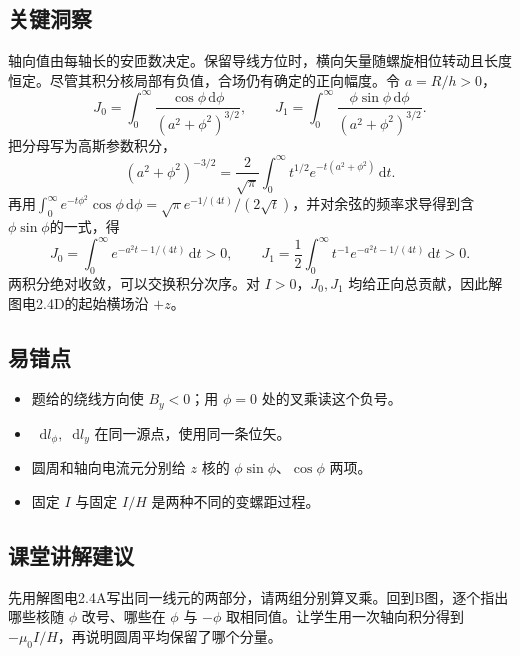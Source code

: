 \documentclass[UTF8,fontset=fandol,a4paper,11pt]{ctexart}
\newcommand{\dd}{\mathop{}\!\mathrm{d}}
\begin{document}


\subsection*{关键洞察}

轴向值由每轴长的安匝数决定。保留导线方位时，横向矢量随螺旋相位转动且长度恒定。尽管其积分核局部有负值，合场仍有确定的正向幅度。令 $a=R/h>0$，
\[
J_0=\int_0^\infty\frac{\cos\phi\,\mathrm d\phi}{(a^2+\phi^2)^{3/2}},\qquad
J_1=\int_0^\infty\frac{\phi\sin\phi\,\mathrm d\phi}{(a^2+\phi^2)^{3/2}}.
\]
把分母写为高斯参数积分，
\[
(a^2+\phi^2)^{-3/2}
=\frac2{\sqrt\pi}\int_0^\infty t^{1/2}e^{-t(a^2+\phi^2)}\,\mathrm dt.
\]
再用$\int_0^\infty e^{-t\phi^2}\cos\phi\,\mathrm d\phi
=\sqrt\pi e^{-1/(4t)}/(2\sqrt t)$，并对余弦的频率求导得到含$\phi\sin\phi$的一式，得
\[
J_0=\int_0^\infty e^{-a^2t-1/(4t)}\,\mathrm dt>0,\qquad
J_1=\frac12\int_0^\infty t^{-1}e^{-a^2t-1/(4t)}\,\mathrm dt>0.
\]
两积分绝对收敛，可以交换积分次序。对 $I>0$，$J_0,J_1$ 均给正向总贡献，因此解图电2.4D的起始横场沿 $+z$。



\subsection*{易错点}

\begin{itemize}
\item 题给的绕线方向使 $B_y<0$；用 $\phi=0$ 处的叉乘读这个负号。
\item $\dd l_\phi,\dd l_y$ 在同一源点，使用同一条位矢。
\item 圆周和轴向电流元分别给 $z$ 核的 $\phi\sin\phi$、$\cos\phi$ 两项。
\item 固定 $I$ 与固定 $I/H$ 是两种不同的变螺距过程。
\end{itemize}



\subsection*{课堂讲解建议}

先用解图电2.4A写出同一线元的两部分，请两组分别算叉乘。回到B图，逐个指出哪些核随 $\phi$ 改号、哪些在 $\phi$ 与 $-\phi$ 取相同值。让学生用一次轴向积分得到 $-\mu_0I/H$，再说明圆周平均保留了哪个分量。
\end{document}
